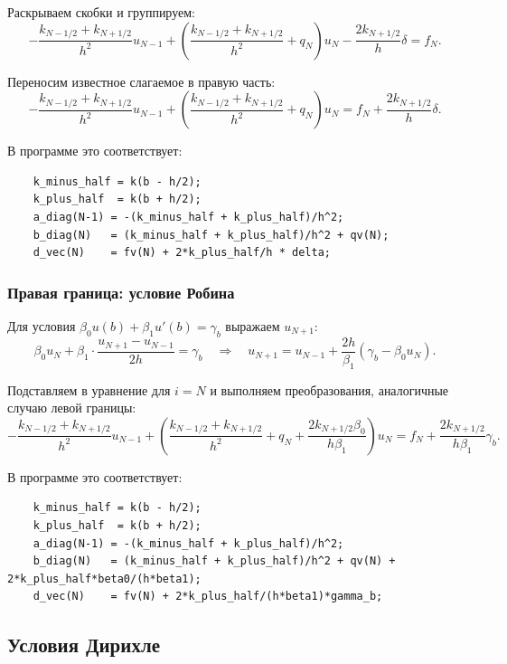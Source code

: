 \documentclass[14pt,a4paper]{extarticle}  %
\numberwithin{equation}{section}
\begin{document}
Раскрываем скобки и группируем:
\[
-\frac{k_{N-1/2}+k_{N+1/2}}{h^2}u_{N-1} + 
\left( \frac{k_{N-1/2}+k_{N+1/2}}{h^2} + q_N \right)u_N - 
\frac{2k_{N+1/2}}{h}\delta = f_N.
\]

Переносим известное слагаемое в правую часть:
\begin{equation}
    -\frac{k_{N-1/2}+k_{N+1/2}}{h^2}u_{N-1} + 
    \left( \frac{k_{N-1/2}+k_{N+1/2}}{h^2} + q_N \right)u_N = 
    f_N + \frac{2k_{N+1/2}}{h}\delta.
    \label{eq:right_neumann_final}
\end{equation}

В программе это соответствует:

\begin{verbatim}
    k_minus_half = k(b - h/2);
    k_plus_half  = k(b + h/2);
    a_diag(N-1) = -(k_minus_half + k_plus_half)/h^2;
    b_diag(N)   = (k_minus_half + k_plus_half)/h^2 + qv(N);
    d_vec(N)    = fv(N) + 2*k_plus_half/h * delta;
\end{verbatim}

\subsubsection{Правая граница: условие Робина}

Для условия \(\beta_0 u(b) + \beta_1 u'(b) = \gamma_b\) выражаем \(u_{N+1}\):
\[
\beta_0 u_N + \beta_1 \cdot \frac{u_{N+1} - u_{N-1}}{2h} = \gamma_b
\quad\Rightarrow\quad
u_{N+1} = u_{N-1} + \frac{2h}{\beta_1}(\gamma_b - \beta_0 u_N).
\]

Подставляем в уравнение для \(i=N\) и выполняем преобразования, аналогичные случаю левой границы:
\begin{equation}
    -\frac{k_{N-1/2}+k_{N+1/2}}{h^2}u_{N-1} + 
    \left( \frac{k_{N-1/2}+k_{N+1/2}}{h^2} + q_N + \frac{2k_{N+1/2}\beta_0}{h\beta_1} \right)u_N = 
    f_N + \frac{2k_{N+1/2}}{h\beta_1}\gamma_b.
    \label{eq:right_robin_final}
\end{equation}

В программе это соответствует:

\begin{verbatim}
    k_minus_half = k(b - h/2);
    k_plus_half  = k(b + h/2);
    a_diag(N-1) = -(k_minus_half + k_plus_half)/h^2;
    b_diag(N)   = (k_minus_half + k_plus_half)/h^2 + qv(N) + 2*k_plus_half*beta0/(h*beta1);
    d_vec(N)    = fv(N) + 2*k_plus_half/(h*beta1)*gamma_b;
\end{verbatim}

\subsection{Условия Дирихле}
\end{document}
